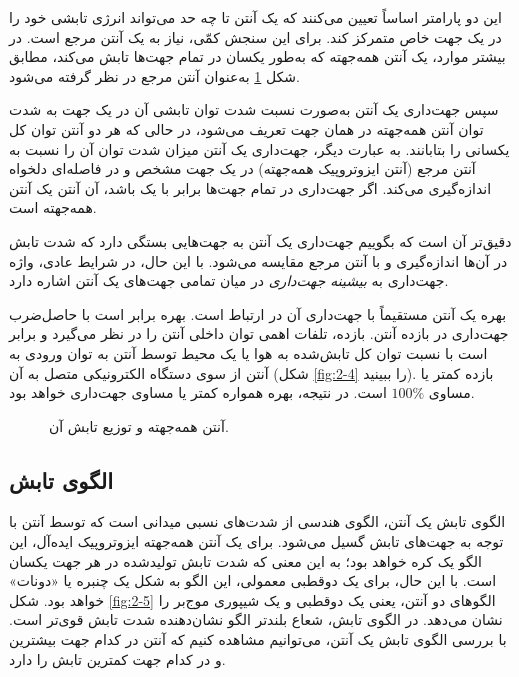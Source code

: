 این دو پارامتر اساساً تعیین می‌کنند که یک آنتن تا چه حد می‌تواند انرژی تابشی خود را در یک جهت خاص متمرکز کند. برای این سنجش کمّی، نیاز به یک آنتن مرجع است. در بیشتر موارد، یک آنتن همه‌جهته که به‌طور یکسان در تمام جهت‌ها تابش می‌کند، مطابق شکل \ref{fig:2-3} به‌عنوان آنتن مرجع در نظر گرفته می‌شود.

سپس جهت‌داری یک آنتن به‌صورت نسبت شدت توان تابشی آن در یک جهت به شدت توان آنتن همه‌جهته در همان جهت تعریف می‌شود، در حالی که هر دو آنتن توان کل یکسانی را بتابانند. به عبارت دیگر، جهت‌داری یک آنتن میزان شدت توان آن را نسبت به آنتن مرجع (آنتن ایزوتروپیک همه‌جهته) در یک جهت مشخص و در فاصله‌ای دلخواه اندازه‌گیری می‌کند. اگر جهت‌داری در تمام جهت‌ها برابر با یک باشد، آن آنتن یک آنتن همه‌جهته است.

دقیق‌تر آن است که بگوییم جهت‌داری یک آنتن به جهت‌هایی بستگی دارد که شدت تابش در آن‌ها اندازه‌گیری و با آنتن مرجع مقایسه می‌شود. با این حال، در شرایط عادی، واژه جهت‌داری به \textit{بیشینه جهت‌داری} در میان تمامی جهت‌های یک آنتن اشاره دارد.

بهره یک آنتن مستقیماً با جهت‌داری آن در ارتباط است. بهره برابر است با حاصل‌ضرب جهت‌داری در بازده آنتن. بازده، تلفات اهمی توان داخلی آنتن را در نظر می‌گیرد و برابر است با نسبت توان کل تابش‌شده به هوا یا یک محیط توسط آنتن به توان ورودی به آنتن از سوی دستگاه الکترونیکی متصل به آن (شکل \ref{fig:2-4} را ببینید). بازده کمتر یا مساوی $100\%$ است. در نتیجه، بهره همواره کمتر یا مساوی جهت‌داری خواهد بود.

\begin{figure}[ht]
	\centering
	\caption{آنتن همه‌جهته و توزیع تابش آن.}
	\label{fig:2-3}
\end{figure}






\subsection{الگوی تابش}
\label{subsec:2-1-2}

الگوی تابش یک آنتن، الگوی هندسی از شدت‌های نسبی میدانی است که توسط آنتن با توجه به جهت‌های تابش گسیل می‌شود. برای یک آنتن همه‌جهته ایزوتروپیک ایده‌آل، این الگو یک کره خواهد بود؛ به این معنی که شدت تابش تولیدشده در هر جهت یکسان است. با این حال، برای یک دوقطبی معمولی، این الگو به شکل یک چنبره یا «دونات» خواهد بود. شکل \ref{fig:2-5} الگوهای دو آنتن، یعنی یک دوقطبی و یک شیپوری موج‌بر را نشان می‌دهد. در الگوی تابش، شعاع بلندتر الگو نشان‌دهنده شدت تابش قوی‌تر است. با بررسی الگوی تابش یک آنتن، می‌توانیم مشاهده کنیم که آنتن در کدام جهت بیشترین و در کدام جهت کمترین تابش را دارد.

